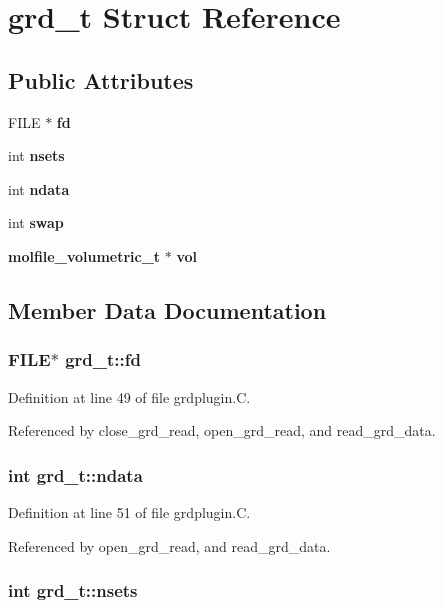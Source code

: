 \section{grd\_\-t  Struct Reference}
\label{structgrd__t}
\subsection*{Public Attributes}
\begin{CompactItemize}
\item 
FILE $\ast$ {\bf fd}
\item 
int {\bf nsets}
\item 
int {\bf ndata}
\item 
int {\bf swap}
\item 
{\bf molfile\_\-volumetric\_\-t} $\ast$ {\bf vol}
\end{CompactItemize}


\subsection{Member Data Documentation}
\subsubsection{\setlength{\rightskip}{0pt plus 5cm}FILE$\ast$ grd\_\-t::fd}\label{structgrd__t_m0}




Definition at line 49 of file grdplugin.C.

Referenced by close\_\-grd\_\-read, open\_\-grd\_\-read, and read\_\-grd\_\-data.
\subsubsection{\setlength{\rightskip}{0pt plus 5cm}int grd\_\-t::ndata}\label{structgrd__t_m2}




Definition at line 51 of file grdplugin.C.

Referenced by open\_\-grd\_\-read, and read\_\-grd\_\-data.
\subsubsection{\setlength{\rightskip}{0pt plus 5cm}int grd\_\-t::nsets}\label{structgrd__t_m1}




